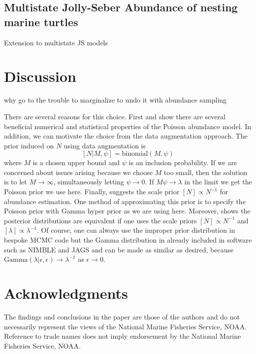 \documentclass[12pt]{article}
\begin{document}
\subsection{Multistate Jolly-Seber Abundance of nesting marine turtles}

Extension to multistate JS models


\section{Discussion}

why go to the trouble to marginalize to undo it with abundance sampling

There are several reasons for this choice. First \cite{schofield201650} and \cite{schofield2023estimating} show there are several beneficial numerical and statistical properties of the Poisson abundance model. In addition, we can motivate the choice from the data augmentation approach. The prior induced on $N$ using data augmentation is  
\[
[N|M, \psi] = \text{binomial}(M,\psi)
\]
where $M$ is a chosen upper bound and $\psi$ is an inclusion probability. If we are concerned about issues arising because we choose $M$ too small, then the solution is to let $M\to\infty$, simultaneously letting $\psi \to 0$. If $M\psi \to \lambda$ in the limit we get the Poisson prior we use here. Finally, \cite{link2013cautionary} suggests the scale prior $[N] \propto N^{-1}$ for abundance estimation. One method of approximating this prior is to specify the Poisson prior with Gamma hyper prior as we are using here. Moreover, \cite{schofield2023estimating} shows the posterior distributions are equivalent if one uses the scale priors $[N] \propto N^{-1}$ and $[\lambda] \propto \lambda^{-1}$. Of course, one can always use the improper prior distribution in bespoke MCMC code but the Gamma distribution in already included in software such as NIMBLE and JAGS and can be made as similar as desired, because $\text{Gamma}(\lambda|\epsilon,\epsilon) \to \lambda^{-1}$ as $\epsilon \to 0$. 




\section*{Acknowledgments}
The findings and conclusions in the paper are those of the authors and do not necessarily represent the views of the National Marine Fisheries Service, NOAA. Reference to trade names does not imply endorsement by the National Marine Fisheries Service, NOAA.
\end{document}
